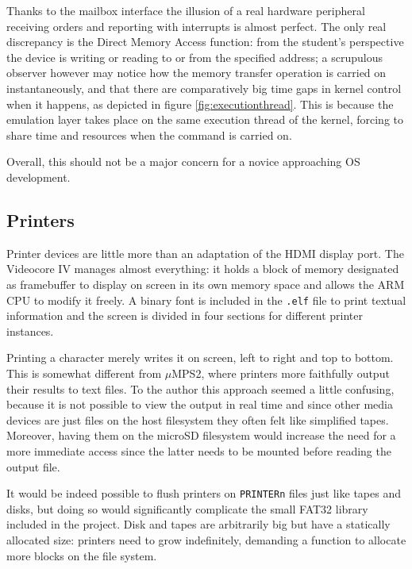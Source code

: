 \documentclass[12pt,a4paper,openright,twoside]{report}
\begin{document}
Thanks to the mailbox interface the illusion of a real hardware peripheral receiving
orders and reporting with interrupts is almost perfect. The only real discrepancy
is the Direct Memory Access function: from the student's perspective the device
is writing or reading to or from the specified address; a scrupulous observer
however may notice how the memory transfer operation is carried on instantaneously,
and that there are comparatively big time gaps in kernel control when it happens,
as depicted in figure \ref{fig:executionthread}.
This is because the emulation layer takes place on the same execution thread of
the kernel, forcing to share time and resources when the command is carried on.

Overall, this should not be a major concern for a novice approaching OS development.

\subsection{Printers}
Printer devices are little more than an adaptation of the HDMI display port.
The Videocore IV manages almost everything: it holds a block of memory designated
as framebuffer to display on screen in its own memory space and allows the ARM
CPU to modify it freely. A binary font is included in the {\tt .elf} file to 
print textual information and the screen is divided in four sections for different
printer instances.

Printing a character merely writes it on screen, left to right and top to bottom.
This is somewhat different from $\mu$MPS2, where printers more faithfully output
their results to text files. To the author this approach seemed a little confusing,
because it is not possible to view the output in real time and since other media
devices are just files on the host filesystem they often felt like simplified 
tapes. Moreover, having them on the microSD filesystem would increase the need
for a more immediate access since the latter needs to be mounted before reading
the output file.

It would be indeed possible to flush printers on {\tt PRINTERn} files just like
tapes and disks, but doing so would significantly complicate the small FAT32 
library included in the project. Disk and tapes are arbitrarily big but have a
statically allocated size: printers need to grow indefinitely, demanding a function
to allocate more blocks on the file system.
\end{document}
